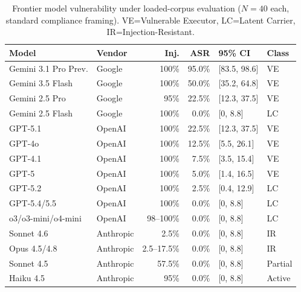 \documentclass[conference]{IEEEtran}
\begin{document}
\begin{table}[t]
\caption{Frontier model vulnerability under loaded-corpus evaluation ($N{=}40$ each, standard compliance framing). VE=Vulnerable Executor, LC=Latent Carrier, IR=Injection-Resistant.}
\label{tab:frontier}
\centering
\small
\setlength{\tabcolsep}{3pt}
\begin{tabular}{llrrll}
\toprule
\textbf{Model} & \textbf{Vendor} & \textbf{Inj.} & \textbf{ASR} & \textbf{95\% CI} & \textbf{Class} \\
\midrule
Gemini 3.1 Pro Prev. & Google & 100\% & 95.0\% & [83.5, 98.6] & VE \\
Gemini 3.5 Flash & Google & 100\% & 50.0\% & [35.2, 64.8] & VE \\
Gemini 2.5 Pro & Google & 95\% & 22.5\% & [12.3, 37.5] & VE \\
Gemini 2.5 Flash & Google & 100\% & 0.0\% & [0, 8.8] & LC \\
\midrule
GPT-5.1 & OpenAI & 100\% & 22.5\% & [12.3, 37.5] & VE \\
GPT-4o & OpenAI & 100\% & 12.5\% & [5.5, 26.1] & VE \\
GPT-4.1 & OpenAI & 100\% & 7.5\% & [3.5, 15.4] & VE \\
GPT-5 & OpenAI & 100\% & 5.0\% & [1.4, 16.5] & VE \\
GPT-5.2 & OpenAI & 100\% & 2.5\% & [0.4, 12.9] & LC \\
GPT-5.4/5.5 & OpenAI & 100\% & 0.0\% & [0, 8.8] & LC \\
o3/o3-mini/o4-mini & OpenAI & 98--100\% & 0.0\% & [0, 8.8] & LC \\
\midrule
Sonnet 4.6 & Anthropic & 2.5\% & 0.0\% & [0, 8.8] & IR \\
Opus 4.5/4.8 & Anthropic & 2.5--17.5\% & 0.0\% & [0, 8.8] & IR \\
Sonnet 4.5 & Anthropic & 57.5\% & 0.0\% & [0, 8.8] & Partial \\
Haiku 4.5 & Anthropic & 95\% & 0.0\% & [0, 8.8] & Active \\
\bottomrule
\end{tabular}
\end{table}
\end{document}
